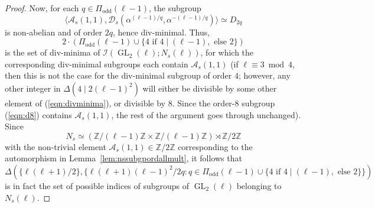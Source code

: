 \documentclass[table,dvipsnames]{amsart}
\newcommand{\GL}{\operatorname{GL}}
\newcommand{\Z}{\mathbb{Z}}
\newcommand{\I}{\mathcal{I}}
\newcommand{\angles}[1]{\langle #1\rangle}
\newcommand{\odd}{\mathrm{odd}}
\numberwithin{equation}{section}
\newcommand{\s}{\textit{s}}
\newcommand{\Ns}{N_\s}
\begin{document}
\begin{proof}
Now, for each $q\in\Pi_\odd(\ell-1)$, the subgroup
\begin{equation*}
\angles{\mathcal{A}_\s(1,1),\mathcal{D}_\s(\alpha^{(\ell-1)/q},\alpha^{-(\ell-1)/q})}\simeq D_{2q}
\end{equation*}
is non-abelian and of order $2q$, hence div-minimal. Thus,
\begin{equation}
\label{eqn:divminima}
2\cdot(\Pi_\odd(\ell-1)\cup\{4\text{ if }4\mid(\ell-1),\text{ else }2\})
\end{equation}
is the set of div-minima of $\I(\GL_2(\ell);\Ns(\ell))$, for which the corresponding div-minimal subgroups each contain $\mathcal{A}_\s(1,1)$ (if $\ell\equiv 3\bmod 4$, then this is not the case for the div-minimal subgroup of order $4$; however, any other integer in $\Delta(4\mid 2(\ell-1)^2)$ will either be divisible by some other element of (\ref{eqn:divminima}), or divisible by $8$. Since the order-$8$ subgroup (\ref{eqn:d8}) contains $\mathcal{A}_\s(1,1)$, the rest of the argument goes through unchanged). Since
\begin{equation*}
\Ns\simeq(\Z/(\ell-1)\Z\times\Z/(\ell-1)\Z)\rtimes\Z/2\Z
\end{equation*}
with the non-trivial element $\mathcal{A}_\s(1,1)\in\Z/2\Z$ corresponding to the automorphism in Lemma~\ref{lem:nssubgpordallmult}, it follows that
\begin{equation*}
\Delta(\{\ell(\ell+1)/2\},\{\ell(\ell+1)(\ell-1)^2/2q:q\in\Pi_\odd(\ell-1)\cup\{4\text{ if }4\mid(\ell-1),\text{ else }2\}\})
\end{equation*}
is in fact the set of possible indices of subgroups of $\GL_2(\ell)$ belonging to $\Ns(\ell)$.
\end{proof}
\end{document}
